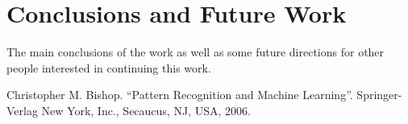 \documentclass[conference]{IEEEtran}
\begin{document}
\section{Conclusions and Future Work}

The main conclusions of the work as well as some future directions for other people interested in continuing this work. 

\begin{thebibliography}{00}
 Christopher M. Bishop. ``Pattern Recognition and Machine Learning''. Springer-Verlag New York, Inc., Secaucus, NJ, USA, 2006. 
\end{thebibliography}
\end{document}
